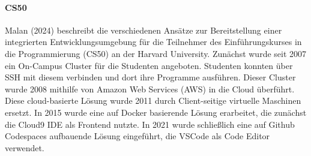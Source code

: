 \paragraph{CS50}
Malan (2024) \cite{malan_containerizing_2024} beschreibt die verschiedenen Ansätze zur Bereitstellung einer integrierten Entwicklungsumgebung für die Teilnehmer des Einführungskurses in die Programmierung (CS50) an der Harvard University. Zunächst wurde seit 2007 ein On-Campus Cluster für die Studenten angeboten. Studenten konnten über SSH mit diesem verbinden und dort ihre Programme ausführen. Dieser Cluster wurde 2008 mithilfe von Amazon Web Services (AWS) \cite{noauthor_amazon_nodate} in die Cloud überführt. Diese cloud-basierte Lösung wurde 2011 durch Client-seitige virtuelle Maschinen ersetzt. In 2015 wurde eine auf Docker basierende Lösung erarbeitet, die zunächst die Cloud9 IDE \cite{noauthor_cloud_nodate} als Frontend nutzte. In 2021 wurde schließlich eine auf Github Codespaces aufbauende Lösung eingeführt, die \ac{VSCode} \cite{noauthor_vscode_nodate} als Code Editor verwendet.